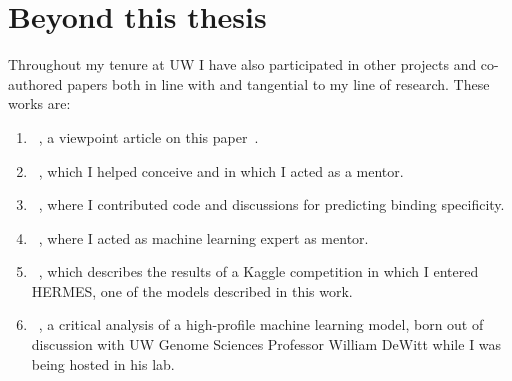 \section{Beyond this thesis}

Throughout my tenure at UW I have also participated in other projects and co-authored papers both in line with and tangential to my line of research.
These works are:
\begin{enumerate}
    \item ~\citet{nourmohammad_machine-learning_2022}, a viewpoint article on this paper~\citep{roney_state---art_2022}.
    \item ~\citet{borisiak_loop-diffusion_2024}, which I helped conceive and in which I acted as a mentor.
    \item ~\citet{Liu2025-hl}, where I contributed code and discussions for predicting binding specificity.
    \item ~\citet{savioli_engine_2024}, where I acted as machine learning expert as mentor.
    \item ~\citet{richardson_immrep25_2026}, which describes the results of a Kaggle competition in which I entered HERMES, one of the models described in this work.
    \item ~\citet{visani_additive_2026}, a critical analysis of a high-profile machine learning model, born out of discussion
            with UW Genome Sciences Professor William DeWitt while I was being hosted in his lab.
\end{enumerate}
















